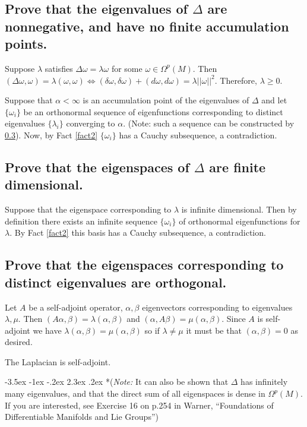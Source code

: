 \documentclass[10pt]{article}
\makeatletter
\renewcommand\section{\@startsection{section}{1}{\z@}%
                                  {-3.5ex \@plus -1ex \@minus -.2ex}%
                                  {2.3ex \@plus.2ex}%
                                  {\normalfont\large\bfseries}}
\DeclareMathOperator{\2}{II}
\newcommand{\note}[1]{{(\emph{Note:} #1)}} %
\makeatother
\begin{document}
\subsection{Prove that the eigenvalues of $\Delta$ are nonnegative, and have no finite accumulation points.}
Suppose $\lambda$ satisfies $\Delta \omega = \lambda \omega$ for some $\omega \in \Omega^p(M)$. Then $(\Delta \omega, \omega) = \lambda(\omega, \omega) \iff (\delta \omega, \delta \omega) + (d \omega, d \omega) = \lambda ||\omega||^2$. Therefore, $\lambda \geq 0$.

Suppose that $\alpha < \infty$ is an accumulation point of the eigenvalues of $\Delta$ and let $\{ \omega_i \}$ be an orthonormal sequence of eigenfunctions corresponding to distinct eigenvalues $\{\lambda_i\}$ converging to $\alpha$. (Note: such a sequence can be constructed by \ref{orthog}). Now, by Fact \ref{fact2} $\{\omega_i \}$ has a Cauchy subsequence, a contradiction.

\subsection{Prove that the eigenspaces of $\Delta$ are finite dimensional.}
Suppose that the eigenspace corresponding to $\lambda$ is infinite dimensional. Then by definition there exists an infinite sequence $\{ \omega_i \}$ of orthonormal eigenfunctions for $\lambda$. By Fact \ref{fact2} this basis has a Cauchy subsequence, a contradiction.

\subsection{Prove that the eigenspaces corresponding to distinct eigenvalues are orthogonal.}\label{orthog}
Let $A$ be a self-adjoint operator, $\alpha, \beta$ eigenvectors corresponding to eigenvalues $\lambda, \mu$. Then $(A \alpha, \beta) = \lambda ( \alpha, \beta)$ and $(\alpha, A \beta) = \mu (\alpha, \beta)$. Since $A$ is self-adjoint we have $\lambda(\alpha, \beta) = \mu(\alpha, \beta)$ so if $\lambda \neq \mu$ it must be that  $(\alpha, \beta)=0$ as desired. 

The Laplacian is self-adjoint.

\section*{\note{It can also be shown that $\Delta$ has infinitely many eigenvalues, and that the direct sum of all eigenspaces is dense in $\Omega^p(M)$. If you are interested, see Exercise 16 on p.254 in Warner, ``Foundations of Differentiable Manifolds and Lie Groups''}}
\end{document}
